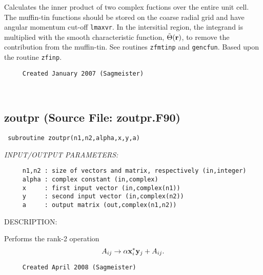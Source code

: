 \documentclass[11pt]{article}
\begin{document}
     Calculates the inner product of two complex fuctions over the entire unit
     cell. The muffin-tin functions should be stored on the coarse radial grid
     and have angular momentum cut-off {\tt lmaxvr}. In the intersitial region,
     the integrand is multiplied with the smooth characteristic function,
     $\tilde{\Theta}({\bf r})$, to remove the contribution from the muffin-tin.
     See routines {\tt zfmtinp} and {\tt gencfun}. Based upon the routine
     {\tt zfinp}.
  
\begin{verbatim}     Created January 2007 (Sagmeister)\end{verbatim}


 
 
\mbox{}\hrulefill\ 
 
\subsection{zoutpr (Source File: zoutpr.F90)}


\begin{verbatim} subroutine zoutpr(n1,n2,alpha,x,y,a)\end{verbatim}{\em INPUT/OUTPUT PARAMETERS:}
\begin{verbatim}     n1,n2 : size of vectors and matrix, respectively (in,integer)
     alpha : complex constant (in,complex)
     x     : first input vector (in,complex(n1))
     y     : second input vector (in,complex(n2))
     a     : output matrix (out,complex(n1,n2))\end{verbatim}
{\sf DESCRIPTION:\\ }


     Performs the rank-2 operation
     $$ A_{ij}\rightarrow\alpha{\bf x}_i^*{\bf y}_j+A_{ij}. $$
  
\begin{verbatim}     Created April 2008 (Sagmeister)\end{verbatim}

\end{document}
